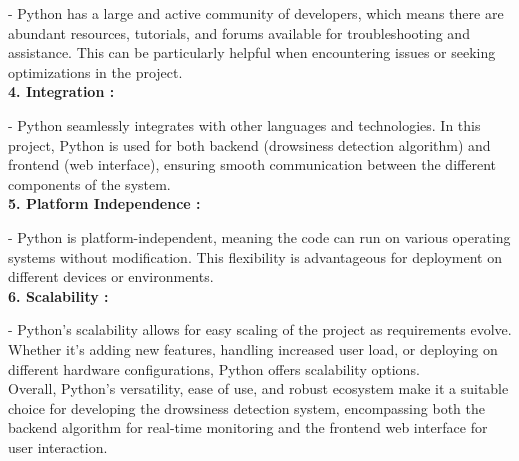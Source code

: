 \documentclass[12pt]{article}
\begin{document}
- Python has a large and active community of developers, which means there are abundant resources, tutorials, and forums available for troubleshooting and assistance. This can be particularly helpful when encountering issues or seeking optimizations in the project.\\

\textbf{4. Integration : }

- Python seamlessly integrates with other languages and technologies. In this project, Python is used for both backend (drowsiness detection algorithm) and frontend (web interface), ensuring smooth communication between the different components of the system.\\

\textbf{5. Platform Independence : }

- Python is platform-independent, meaning the code can run on various operating systems without modification. This flexibility is advantageous for deployment on different devices or environments.\\

\textbf{6. Scalability : }

- Python's scalability allows for easy scaling of the project as requirements evolve. Whether it's adding new features, handling increased user load, or deploying on different hardware configurations, Python offers scalability options.\\

Overall, Python's versatility, ease of use, and robust ecosystem make it a suitable choice for developing the drowsiness detection system, encompassing both the backend algorithm for real-time monitoring and the frontend web interface for user interaction.
\end{document}
